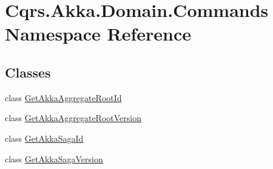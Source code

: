 \hypertarget{namespaceCqrs_1_1Akka_1_1Domain_1_1Commands}{}\section{Cqrs.\+Akka.\+Domain.\+Commands Namespace Reference}
\label{namespaceCqrs_1_1Akka_1_1Domain_1_1Commands}
\subsection*{Classes}
\begin{DoxyCompactItemize}
\item 
class \hyperlink{classCqrs_1_1Akka_1_1Domain_1_1Commands_1_1GetAkkaAggregateRootId}{Get\+Akka\+Aggregate\+Root\+Id}
\item 
class \hyperlink{classCqrs_1_1Akka_1_1Domain_1_1Commands_1_1GetAkkaAggregateRootVersion}{Get\+Akka\+Aggregate\+Root\+Version}
\item 
class \hyperlink{classCqrs_1_1Akka_1_1Domain_1_1Commands_1_1GetAkkaSagaId}{Get\+Akka\+Saga\+Id}
\item 
class \hyperlink{classCqrs_1_1Akka_1_1Domain_1_1Commands_1_1GetAkkaSagaVersion}{Get\+Akka\+Saga\+Version}
\end{DoxyCompactItemize}
